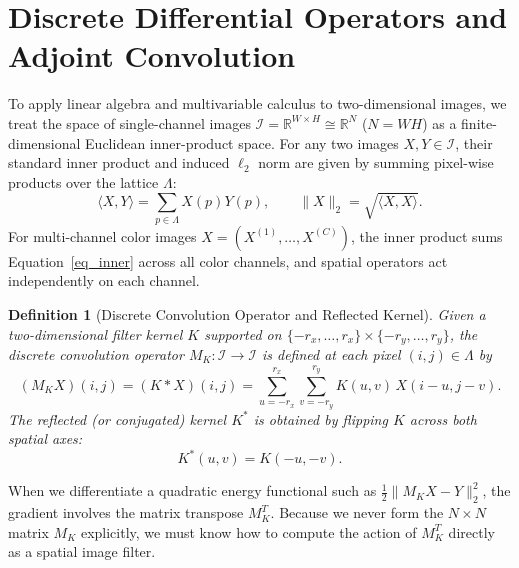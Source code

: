\documentclass{amsart}
\newtheorem{define}[theorem]{Definition}
\begin{document}
\section{Discrete Differential Operators and Adjoint Convolution}\label{sec_ops}

To apply linear algebra and multivariable calculus to two-dimensional images, we treat the space of single-channel images $\mathcal{I} = \mathbb{R}^{W \times H} \cong \mathbb{R}^N$ ($N = W H$) as a finite-dimensional Euclidean inner-product space. For any two images $X, Y \in \mathcal{I}$, their standard inner product and induced $\ell_2$ norm are given by summing pixel-wise products over the lattice $\Lambda$:
\begin{equation}\label{eq_inner}
    \langle X, Y \rangle = \sum_{p \in \Lambda} X(p) Y(p), \qquad \|X\|_2 = \sqrt{\langle X, X \rangle}.
\end{equation}
For multi-channel color images $X = (X^{(1)}, \dots, X^{(C)})$, the inner product sums Equation~\eqref{eq_inner} across all color channels, and spatial operators act independently on each channel.

\begin{define}[Discrete Convolution Operator and Reflected Kernel]\label{def_conv}
    Given a two-dimensional filter kernel $K$ supported on $\{-r_x, \dots, r_x\} \times \{-r_y, \dots, r_y\}$, the discrete convolution operator $M_K : \mathcal{I} \to \mathcal{I}$ is defined at each pixel $(i, j) \in \Lambda$ by
    \begin{equation}\label{eq_conv}
        (M_K X)(i, j) = (K * X)(i, j) = \sum_{u = -r_x}^{r_x} \sum_{v = -r_y}^{r_y} K(u, v)\, X(i - u, j - v).
    \end{equation}
    The reflected (or conjugated) kernel $K^*$ is obtained by flipping $K$ across both spatial axes:
    \[
        K^*(u, v) = K(-u, -v).
    \]
\end{define}

When we differentiate a quadratic energy functional such as $\frac{1}{2}\|M_K X - Y\|_2^2$, the gradient involves the matrix transpose $M_K^T$. Because we never form the $N \times N$ matrix $M_K$ explicitly, we must know how to compute the action of $M_K^T$ directly as a spatial image filter.
\end{document}
